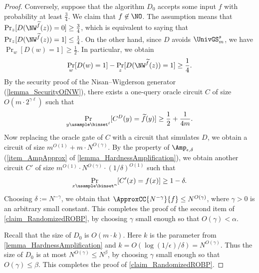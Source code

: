 \documentclass[11pt]{article}
\numberwithin{equation}{section}
\theoremstyle{definition}
\theoremstyle{plain}
\begin{document}
\begin{proof}
  Conversely, suppose that the algorithm $D_0$ accepts some input $f$ with probability at least $\frac{3}{4}$.
  We claim that $f \not\in \NO$. %
  The assumption means that
  $ \Pr_z[ D(\NW^{\widetilde{f}}(z)) = 0 ] \ge \frac{3}{4}$, which is equivalent to saying that $\Pr_z[ D(\NW^{\widetilde{f}}(z)) = 1 ] \le \frac{1}{4}$.
  On the other hand, since $D$ avoids $\UnivGS_m^s$, we have $\Pr_w [ D(w) = 1 ] \ge \frac{1}{2}$.
  In particular, we obtain
  \begin{align*}
    \Pr_w[ D(w) = 1 ] - \Pr_z[ D(\NW^{\widetilde{f}}(z)) = 1 ] \ge \frac{1}{4}.
  \end{align*}
  By the security proof of the Nisan--Wigderson generator (\cref{lemma_SecurityOfNW}),
  there exists a one-query oracle circuit $C$ of size $O(m \cdot 2^{\gamma \ell})$ such that
  \begin{align*}
    \Pr_{y \usample \binset^\ell}[ C^D(y) = {\widetilde{f}}(y) ]  \ge \frac{1}{2} + \frac{1}{4m}.
  \end{align*}
  Now replacing the oracle gate of $C$ with a circuit that simulates $D$,
  we obtain a circuit of size $m^{O(1)} + m \cdot N^{O(\gamma)}$.
  By the property of $\Amp_{\epsilon, \delta}$ (\cref{item_AmpApprox} of \cref{lemma_HardnessAmplification}),
  we obtain another circuit $C'$ of size $m^{O(1)} \cdot N^{O(\gamma)} \cdot (1/\delta)^{O(1)}$ such that
  $$
    \Pr_{x \usample \binset^n}[ C'(x) = f(x) ]  \ge 1 - \delta.
  $$
  Choosing $\delta := N^{-\gamma}$,
  we obtain that $\ApproxCC{N^{-\gamma}}{f} \le N^{O(\gamma)}$,
  where $\gamma > 0$ is an arbitrary small constant.
  This completes the proof of the second item of \cref{claim_RandomizedROBP},
  by choosing $\gamma$ small enough so that $O(\gamma) < \alpha$.

  Recall that the size of $D_0$ is $O(m \cdot k)$.
  Here $k$ is the parameter from \cref{lemma_HardnessAmplification} and $k = O( \log ( 1 / \epsilon ) / \delta ) = N^{O(\gamma)}$.
  Thus the size of $D_0$ is at most $N^{O(\gamma)} \le N^\beta$, by choosing $\gamma$ small enough so that $O(\gamma) \le \beta$.
  This completes the proof of \cref{claim_RandomizedROBP}.


\end{proof}
\end{document}
